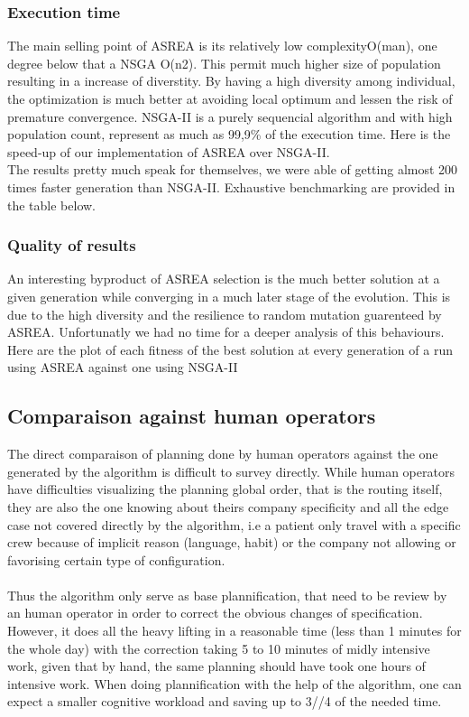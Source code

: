 \documentclass[12pt]{memoir}
\begin{document}
\subsubsection{Execution time}
The main selling point of ASREA is its relatively low complexityO(man), one degree below that a NSGA O(n2). 
This permit much higher size of population resulting in a increase of diverstity. By having a high diversity 
among individual, the optimization is much better at avoiding local optimum and lessen the risk of premature 
convergence. NSGA-II is a purely sequencial algorithm and with high population count, represent as much as 
99,9\% of the execution time. Here is the speed-up of our implementation of ASREA over NSGA-II. \\
The results pretty much speak for themselves, we were able of getting almost 200 times faster generation 
than NSGA-II. Exhaustive benchmarking are provided in the table below.
 
\subsubsection{Quality of results}
An interesting byproduct of ASREA selection is the much better solution at a given generation while converging
in a much later stage of the evolution. This is due to the high diversity and the resilience to random mutation 
guarenteed by ASREA. Unfortunatly we had no time for a deeper analysis of this behaviours. Here are the plot of 
each fitness of the best solution at every generation of a run using ASREA against one using NSGA-II 

\subsection{Comparaison against human operators}
The direct comparaison of planning done by human operators against the one generated by the algorithm is difficult 
to survey directly. While human operators have difficulties visualizing the planning global order, that is the routing
 itself, they are also the one knowing about theirs company specificity and all the edge case not covered directly by 
the algorithm, i.e a patient only travel with a specific crew because of implicit reason (language, habit) or the company 
not allowing or favorising certain type of configuration.\\
\\
Thus the algorithm only serve as base plannification, that need to be review by an human operator in order to correct 
the obvious changes of specification. However, it does all the heavy lifting in a reasonable time (less than 1 minutes 
for the whole day) with the correction taking 5 to 10 minutes of midly intensive work, given that by hand, the same planning
should have took one hours of intensive work. When doing plannification with the help of the algorithm, one can expect a smaller 
cognitive workload and saving up to 3//4 of the needed time.  
\end{document}
